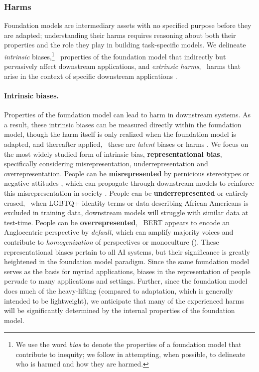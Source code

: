 \subsubsection{Harms}
\label{sec:fairness-harms}
Foundation models are intermediary assets with no specified purpose before they are adapted; understanding their harms requires reasoning about both their properties and the role they play in building task-specific models. 
We delineate \textit{intrinsic} biases,\footnote{We use the word \textit{bias} to denote the properties of a foundation model that contribute to inequity; we follow \citet{blodgett_language_2020} in attempting, when possible, to delineate who is harmed and how they are harmed.} \ie~properties of the  foundation model that indirectly but pervasively affect downstream applications, and \textit{extrinsic harms}, \ie~harms that arise in the context of specific downstream applications \citep{galliers1993}.

\paragraph{Intrinsic biases.}
Properties of the foundation model can lead to harm in downstream systems.
As a result, these intrinsic biases can be measured directly within the foundation model, though the harm itself is only realized when the foundation model is adapted, and thereafter applied, \ie~these are \textit{latent} biases or harms \citep{DeCamp2020}.
We focus on the most widely studied form of intrinsic bias, \textbf{representational bias}, specifically considering misrepresentation, underrepresentation and overrepresentation. 
People can be \textbf{misrepresented} by pernicious stereotypes \citep{bolukbasi2016, caliskan2017, abid2021,stereoset,gehman-etal-2020-realtoxicityprompts} or negative attitudes \citep{hutchinson2020}, which can propagate through downstream models to reinforce this misrepresentation in society \cite{noble,benjamin2019}. 
People can be \textbf{underrepresented} or entirely erased, \eg~when LGBTQ+ identity terms  \citep{Strengers2020, Oliva2021, Tomasev2021} or data describing African Americans \cite{buolamwini2018gender,koenecke2020racial,blodgett17} is excluded in training data, downstream models will struggle with similar data at test-time.
People can be \textbf{overrepresented}, \eg~BERT appears to encode an Anglocentric perspective \citep{zhou2021} by \textit{default}, which can amplify majority voices and contribute to \textit{homogenization} of perspectives \citep{creel2021} or monoculture \citep{kleinberg2021} (). 
These representational biases pertain to all AI systems, but their significance is greatly heightened in the foundation model paradigm.
Since the same foundation model serves as the basis for myriad applications, biases in the representation of people pervade to many applications and settings.
Further, since the foundation model does much of the heavy-lifting (compared to adaptation, which is generally intended to be lightweight), we anticipate that many of the experienced harms will be significantly determined by the internal properties of the foundation model.


